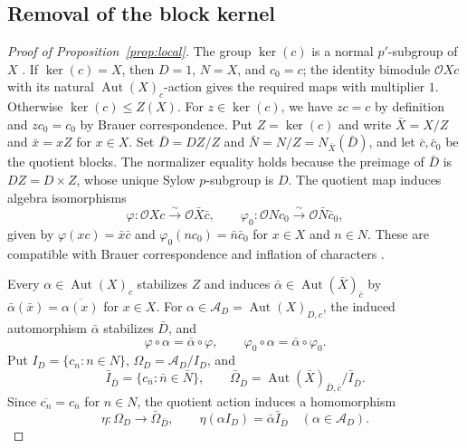 \documentclass[11pt,a4paper]{article}
\theoremstyle{definition}
\theoremstyle{remark}
\numberwithin{equation}{section}
\newcommand{\cO}{\mathcal{O}}
\DeclareMathOperator{\Aut}{Aut}
\begin{document}
	\subsection{Removal of the block kernel}
	
	\begin{proof}[Proof of Proposition~\ref{prop:local}]
		The group $\ker(c)$ is a normal $p'$-subgroup of $X$
		\cite[Theorem~6.10]{Navarro1998}.
		If $\ker(c)=X$, then $D=1$, $N=X$, and $c_0=c$;
		the identity bimodule $\cO Xc$ with its natural
		$\Aut(X)_c$-action gives the required maps with multiplier $1$.
		Otherwise $\ker(c)\leq Z(X)$. For $z\in\ker(c)$, we have $zc=c$
		by definition and $zc_0=c_0$ by Brauer correspondence.
		Put $Z=\ker(c)$ and write $\bar X=X/Z$ and $\bar x=xZ$
		for $x\in X$. Set $\bar D=DZ/Z$ and
		$\bar N=N/Z=N_{\bar X}(\bar D)$,
		and let $\bar c,\bar c_0$ be the quotient blocks.
		The normalizer equality holds because the preimage of $\bar D$
		is $DZ=D\times Z$, whose unique Sylow $p$-subgroup is $D$.
		The quotient map induces algebra isomorphisms
		\[
		\varphi:\cO Xc\xrightarrow{\sim}\cO\bar X\bar c,\qquad
		\varphi_0:\cO Nc_0\xrightarrow{\sim}\cO\bar N\bar c_0,
		\]
		given by $\varphi(xc)=\bar x\bar c$ and
		$\varphi_0(nc_0)=\bar n\bar c_0$ for $x\in X$ and $n\in N$.
		These are compatible with Brauer correspondence and inflation
		of characters \cite[Theorem~9.9(c)]{Navarro1998}.
		
		Every $\alpha\in\Aut(X)_c$ stabilizes $Z$ and induces
		$\bar\alpha\in\Aut(\bar X)_{\bar c}$ by
		$\bar\alpha(\bar x)=\overline{\alpha(x)}$ for $x\in X$.
		For $\alpha\in\mathcal A_D=\Aut(X)_{D,c}$, the induced
		automorphism $\bar\alpha$ stabilizes $\bar D$, and
		\[
		\varphi\circ\alpha=\bar\alpha\circ\varphi,\qquad
		\varphi_0\circ\alpha=\bar\alpha\circ\varphi_0.
		\]
		Put $I_D=\{c_n:n\in N\}$, $\Omega_D=\mathcal A_D/I_D$, and
		\[
		\bar I_{\bar D}=\{c_{\bar n}:\bar n\in\bar N\},\qquad
		\bar\Omega_{\bar D}=
		\Aut(\bar X)_{\bar D,\bar c}/\bar I_{\bar D}.
		\]
		Since $\overline{c_n}=c_{\bar n}$ for $n\in N$, the quotient action
		induces a homomorphism
		\[
		\eta:\Omega_D\longrightarrow\bar\Omega_{\bar D},\qquad
		\eta(\alpha I_D)=\bar\alpha\bar I_{\bar D}
		\quad(\alpha\in\mathcal A_D).
		\]
		

\end{proof}
\end{document}

